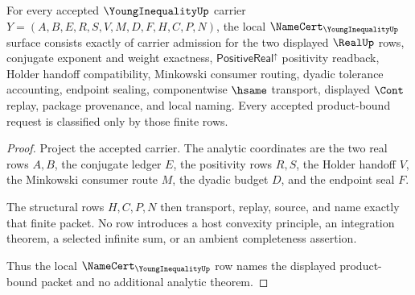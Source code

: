 \begin{theorem}\label{thm:young-inequality-namecert-obligations}
For every accepted $\YoungInequalityUp$ carrier $Y=(A,B,E,R,S,V,M,D,F,H,C,P,N)$, the local $\NameCert_{\YoungInequalityUp}$ surface consists exactly of carrier admission for the two displayed $\RealUp$ rows, conjugate exponent and weight exactness, $\mathsf{PositiveReal}^{\uparrow}$ positivity readback, Holder handoff compatibility, Minkowski consumer routing, dyadic tolerance accounting, endpoint sealing, componentwise $\hsame$ transport, displayed $\Cont$ replay, package provenance, and local naming. Every accepted product-bound request is classified only by those finite rows.
\end{theorem}
\begin{proof}
Project the accepted carrier. The analytic coordinates are the two real rows $A,B$, the conjugate ledger $E$, the positivity rows $R,S$, the Holder handoff $V$, the Minkowski consumer route $M$, the dyadic budget $D$, and the endpoint seal $F$.

The structural rows $H,C,P,N$ then transport, replay, source, and name exactly that finite packet. No row introduces a host convexity principle, an integration theorem, a selected infinite sum, or an ambient completeness assertion.

Thus the local $\NameCert_{\YoungInequalityUp}$ row names the displayed product-bound packet and no additional analytic theorem.
\end{proof}

